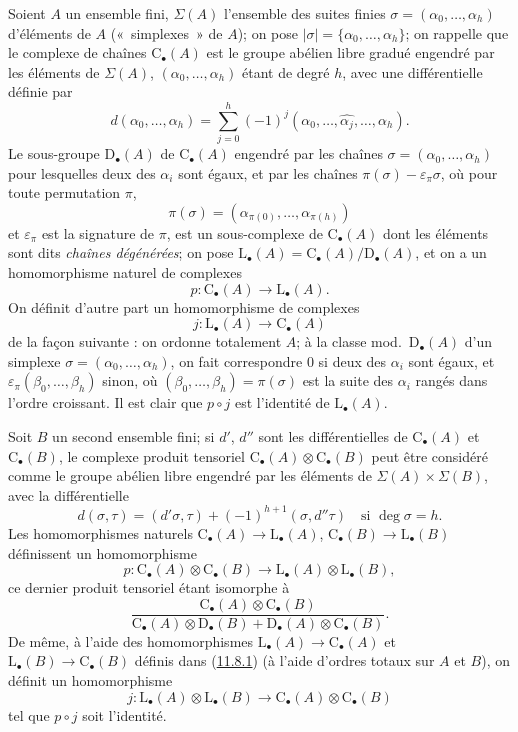 \begin{env}[11.8.1]
\label{0.11.8.1-fr}
Soient $A$ un ensemble fini, $\Sigma(A)$ l'ensemble des suites finies
$\sigma=(\alpha_0,\ldots,\alpha_h)$ d'éléments de $A$ («~simplexes~» de
$A$); on pose $|\sigma|=\{\alpha_0,\ldots,\alpha_h\}$; on rappelle que le
complexe de chaînes $\mathrm C_\bullet(A)$ est le groupe abélien libre
gradué engendré par les éléments de $\Sigma(A)$,
$(\alpha_0,\ldots,\alpha_h)$ étant de degré $h$, avec une différentielle
définie par
\[
d(\alpha_0,\ldots,\alpha_h)=
\sum_{j=0}^{h}(-1)^j
(\alpha_0,\ldots,\widehat{\alpha_j},\ldots,\alpha_h).
\]
Le sous-groupe $\mathrm D_\bullet(A)$ de $\mathrm C_\bullet(A)$ engendré par
les chaînes $\sigma=(\alpha_0,\ldots,\alpha_h)$ pour lesquelles deux des
$\alpha_i$ sont égaux, et par les chaînes
$\pi(\sigma)-\varepsilon_\pi\sigma$, où pour toute permutation $\pi$,
\[
\pi(\sigma)=(\alpha_{\pi(0)},\ldots,\alpha_{\pi(h)})
\]
et $\varepsilon_\pi$ est la signature de $\pi$, est un sous-complexe de
$\mathrm C_\bullet(A)$ dont les éléments sont dits \emph{chaînes
dégénérées}; on pose
$\mathrm L_\bullet(A)=\mathrm C_\bullet(A)/\mathrm D_\bullet(A)$, et on a un
homomorphisme naturel de complexes
\[
p:\mathrm C_\bullet(A)\longrightarrow\mathrm L_\bullet(A).
\]
On définit d'autre part un homomorphisme de complexes
\[
j:\mathrm L_\bullet(A)\longrightarrow\mathrm C_\bullet(A)
\]
de la façon suivante : on ordonne totalement $A$; à la classe
mod.~$\mathrm D_\bullet(A)$ d'un simplexe
$\sigma=(\alpha_0,\ldots,\alpha_h)$, on fait correspondre $0$ si deux des
$\alpha_i$ sont égaux, et $\varepsilon_\pi(\beta_0,\ldots,\beta_h)$ sinon, où
$(\beta_0,\ldots,\beta_h)=\pi(\sigma)$ est la suite des $\alpha_i$ rangés dans l'ordre croissant. Il est clair que $p\circ
j$ est l'identité de $\mathrm L_\bullet(A)$.
\end{env}

\begin{env}[11.8.2]
\label{0.11.8.2-fr}
Soit $B$ un second ensemble fini; si $d'$, $d''$ sont les différentielles de
$\mathrm C_\bullet(A)$ et $\mathrm C_\bullet(B)$, le complexe produit
tensoriel $\mathrm C_\bullet(A)\otimes\mathrm C_\bullet(B)$ peut être
considéré comme le groupe abélien libre engendré par les éléments de
$\Sigma(A)\times\Sigma(B)$, avec la différentielle
\[
d(\sigma,\tau)=(d'\sigma,\tau)+(-1)^{h+1}(\sigma,d''\tau)
\quad\text{si }\deg\sigma=h.
\]
Les homomorphismes naturels
$\mathrm C_\bullet(A)\to\mathrm L_\bullet(A)$,
$\mathrm C_\bullet(B)\to\mathrm L_\bullet(B)$ définissent un homomorphisme
\[
p:\mathrm C_\bullet(A)\otimes\mathrm C_\bullet(B)
\longrightarrow\mathrm L_\bullet(A)\otimes\mathrm L_\bullet(B),
\]
ce dernier produit tensoriel étant isomorphe à
\[
\frac{\mathrm C_\bullet(A)\otimes\mathrm C_\bullet(B)}
{\mathrm C_\bullet(A)\otimes\mathrm D_\bullet(B)
+\mathrm D_\bullet(A)\otimes\mathrm C_\bullet(B)}.
\]
De même, à l'aide des homomorphismes
$\mathrm L_\bullet(A)\to\mathrm C_\bullet(A)$ et
$\mathrm L_\bullet(B)\to\mathrm C_\bullet(B)$ définis dans
(\hyperref[0.11.8.1-fr]{11.8.1}) (à l'aide d'ordres totaux sur $A$ et $B$),
on définit un homomorphisme
\[
j:\mathrm L_\bullet(A)\otimes\mathrm L_\bullet(B)
\longrightarrow\mathrm C_\bullet(A)\otimes\mathrm C_\bullet(B)
\]
tel que $p\circ j$ soit l'identité.
\end{env}

